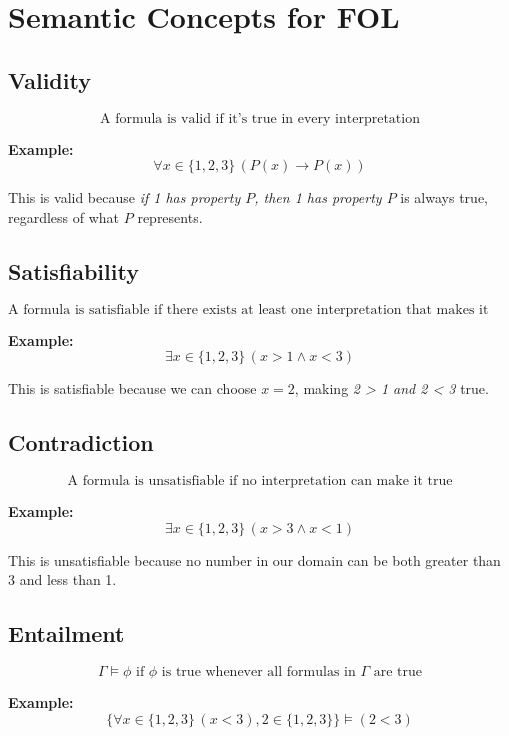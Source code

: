\documentclass[12pt,a4paper,openany]{article}
\begin{document}

\section{Semantic Concepts for FOL}

\subsection{Validity}

$$\text{A formula is valid if it's true in every interpretation}$$

\textbf{Example:} 
$$\forall x \in \{1,2,3\} \, (P(x) \to P(x))$$

This is valid because \textit{if 1 has property $P$, then 1 has property $P$} is always true, regardless of what $P$ represents.

\subsection{Satisfiability}

$$\text{A formula is satisfiable if there exists at least one interpretation that makes it true}$$

\textbf{Example:} 
$$\exists x \in \{1,2,3\} \, (x > 1 \wedge x < 3)$$

This is satisfiable because we can choose $x = 2$, making \textit{2 > 1 and 2 < 3} true.

\subsection{Contradiction}

$$\text{A formula is unsatisfiable if no interpretation can make it true}$$

\textbf{Example:}
$$\exists x \in \{1,2,3\} \, (x > 3 \wedge x < 1)$$

This is unsatisfiable because no number in our domain can be both greater than 3 and less than 1.

\subsection{Entailment}

$$\Gamma \models \phi \text{ if } \phi \text{ is true whenever all formulas in } \Gamma \text{ are true}$$

\textbf{Example:} 
$$\{\forall x \in \{1,2,3\} \, (x < 3), 2 \in \{1,2,3\}\} \models (2 < 3)$$
\end{document}
